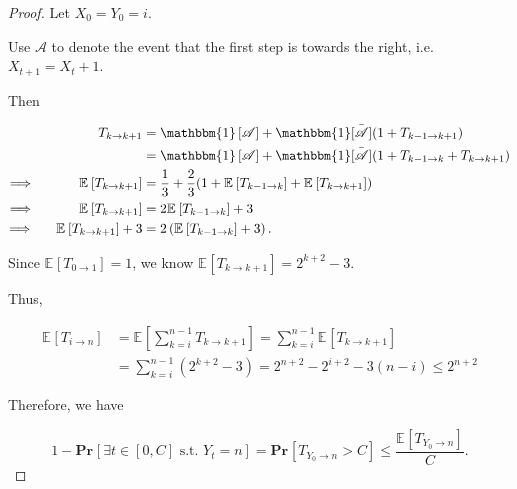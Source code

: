 \documentclass{article}
\renewcommand{\Pr}[2]{\mathbf{Pr}_{#1}\left[#2\right]}
\newcommand{\staExp}[2]{\mathbb{E}_{#1}\left[#2\right]}
\begin{document}
\begin{proof}
    \hspace{1.3em}
    Let $X_0=Y_0=i$. 
    
    \hspace{1.3em}
    Use $\mathscr{A}$ to denote the event that the first step is towards the right, i.e. $X_{t+1}=X_t+1$.
    
    \hspace{1.3em}
    Then 
    
    \vspace{-3em}
    \begin{align*}
        T_{k\rightarrow k+1} &= \mathbbm{1}\left[\mathscr{A}\right]+\mathbbm{1}\bar{\left[\mathscr{A}\right]}(1+T_{k-1\rightarrow k+1}) \\ 
        & =\mathbbm{1}\left[\mathscr{A}\right]+\mathbbm{1}\bar{\left[\mathscr{A}\right]}(1+T_{k-1\rightarrow k}+T_{k\rightarrow k+1}) \\
        \Longrightarrow\ \qquad\quad\staExp{}{T_{k\rightarrow k+1}} & = \frac{1}{3}+\frac{2}{3}(1+\staExp{}{T_{k-1\rightarrow k}}+\staExp{}{T_{k\rightarrow k+1}}) \\
        \Longrightarrow\ \qquad\quad\staExp{}{T_{k\rightarrow k+1}} & = 2\staExp{}{T_{k-1\rightarrow k}}+3 \\
        \Longrightarrow\quad\ \ \staExp{}{T_{k\rightarrow k+1}}+3 & = 2\left(\staExp{}{T_{k-1\rightarrow k}}+3\right).
    \end{align*}
    
    \vspace{-0.6em} \hspace{1.3em}
    Since $\staExp{}{T_{0\rightarrow 1}}=1$, we know $\staExp{}{T_{k\rightarrow k+1}}=2^{k+2}-3$.
    
    \hspace{1.3em}
    Thus,
    
    \vspace{-3em}
    \begin{align*}
        \staExp{}{T_{i\rightarrow n}} & = \staExp{}{\sum_{k=i}^{n-1}T_{k\rightarrow k+1}}  = \sum_{k=i}^{n-1}\staExp{}{T_{k\rightarrow k+1}} \\
        & = \sum_{k=i}^{n-1}\left(2^{k+2}-3\right) = 2^{n+2}-2^{i+2}-3(n-i) \le 2^{n+2}
    \end{align*}
    
    \vspace{-0.6em} \hspace{1.3em}
    Therefore, we have
    
    \vspace{-1.5em}
    $$1-\Pr{}{\exists t\in[0,C]\text{ s.t. } Y_t=n} = \Pr{}{T_{Y_0\rightarrow n}>C} \le\frac{\staExp{}{T_{Y_0\rightarrow n}}}{C}. $$
    

\end{proof}
\end{document}
